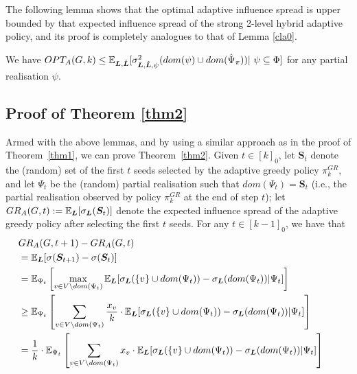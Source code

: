 The following lemma shows that the optimal adaptive influence spread is upper bounded by that expected influence spread of the strong 2-level hybrid adaptive policy, and its proof is completely analogues to that of Lemma \ref{cla0}. 
\begin{lemma}\label{scla0}
We have $OPT_A(G,k)\leq \mathbb{E}_{\bm L,\hat{\bm L}}[\sigma^{2}_{\bm L,\hat{\bm L},\psi}(dom(\psi)\cup dom(\hat{\Psi}_{\pi}))|~\psi\subseteq\Phi]$ for any partial realisation $\psi$.
\end{lemma}
\subsection{Proof of Theorem \ref{thm2}}\label{proofthm2}
Armed with the above lemmas, and by using a similar approach as in the proof of Theorem~\ref{thm1}, we can prove Theorem~\ref{thm2}. Given $t\in [k]_0$, let $\bm S_{t}$ denote the (random) set of the first $t$ seeds selected by the adaptive greedy policy $\pi^{GR}_k$, and let $\Psi_t$ be the (random) partial realisation such that $dom(\Psi_t)=\bm S_t$ (i.e., the partial realisation observed by policy $\pi^{GR}_k$ at the end of step $t$); let $GR_A(G,t):=\mathbb{E}_{\bm L}[\sigma_{\bm L}(\bm S_t)]$ denote the expected influence spread of the adaptive greedy policy after selecting the first $t$ seeds. For any $t\in [k-1]_0$, we have that
\begin{align}
& GR_A(G,t+1)-GR_A(G,t)\makebox[0.618\textwidth][l]{}\nonumber\\
&=\E_{\bm L}[\sigma(\bm S_{t+1})-\sigma(\bm S_{t})]\nonumber\\
&= \E_{\Psi_t}\left[\max_{v\in V\setminus dom(\Psi_t)}\E_{\bm L}[\sigma_{\bm L}(\{v\}\cup dom(\Psi_t))-\sigma_{\bm L}(dom(\Psi_t))|\Psi_t]\right]\label{sequ1.0}\\
&\geq \E_{\Psi_t}\left[\sum_{v\in V\setminus dom(\Psi_t)}\frac{x_v}{k}\cdot \E_{\bm L}[\sigma_{\bm L}(\{v\}\cup dom(\Psi_t))-\sigma_{\bm L}(dom(\Psi_t))|\Psi_t]\right]\nonumber\\
&= \frac{1}{k}\cdot \E_{\Psi_t}\left[\sum_{v\in V\setminus dom(\Psi_t)}x_v\cdot \E_{\bm L}[\sigma_{\bm L}(\{v\}\cup dom(\Psi_t))-\sigma_{\bm L}(dom(\Psi_t))|\Psi_t]\right]\nonumber
\end{align}
